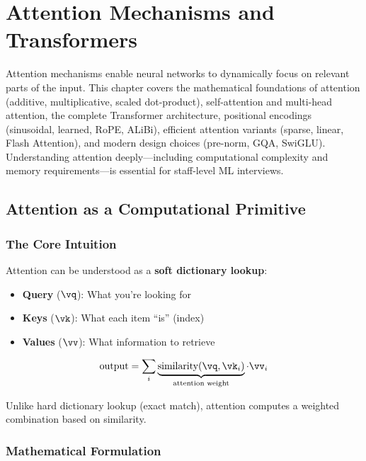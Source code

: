 \chapter{Attention Mechanisms and Transformers}
\label{chap:attention_transformers}

\begin{tldr}
Attention mechanisms enable neural networks to dynamically focus on relevant parts of the input. This chapter covers the mathematical foundations of attention (additive, multiplicative, scaled dot-product), self-attention and multi-head attention, the complete Transformer architecture, positional encodings (sinusoidal, learned, RoPE, ALiBi), efficient attention variants (sparse, linear, Flash Attention), and modern design choices (pre-norm, GQA, SwiGLU). Understanding attention deeply---including computational complexity and memory requirements---is essential for staff-level ML interviews.
\end{tldr}

\section{Attention as a Computational Primitive}
\label{sec:attention_primitive}

\subsection{The Core Intuition}

Attention can be understood as a \textbf{soft dictionary lookup}:

\begin{itemize}
    \item \textbf{Query} ($\vq$): What you're looking for
    \item \textbf{Keys} ($\vk$): What each item ``is'' (index)
    \item \textbf{Values} ($\vv$): What information to retrieve
\end{itemize}

\begin{equation}
\text{output} = \sum_i \underbrace{\text{similarity}(\vq, \vk_i)}_{\text{attention weight}} \cdot \vv_i
\end{equation}

Unlike hard dictionary lookup (exact match), attention computes a weighted combination based on similarity.

\subsection{Mathematical Formulation}

